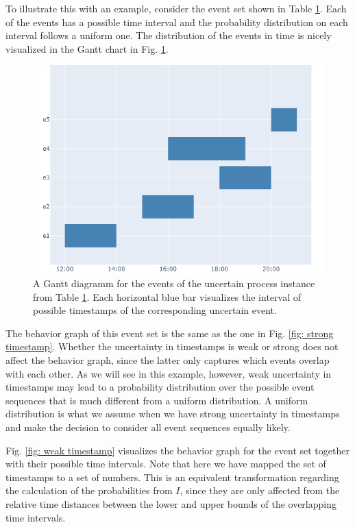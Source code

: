 \begin{itemize}
\begin{table}[h]
\begin{tabular}{ccc}
	\end{tabular}
	\label{table: weak timestamps}
\end{table} 
%
%
%

To illustrate this with an example, consider the event set shown in Table \ref{table: weak timestamps}.
Each of the events has a possible time interval and the probability distribution on each interval follows a uniform one.
The distribution of the events in time is nicely visualized in the Gantt chart in Fig. \ref{fig: gantt}. 
%
%
%
\begin{figure}
	\centering
	\includegraphics[width=0.8\columnwidth]{figures/gantt_thesis.png}
	\caption{A Gantt diagramm for the events of the uncertain process instance from Table \ref{table: weak timestamps}.
	Each horizontal blue bar visualizes the interval of possible timestamps of the corresponding uncertain event.}
	\label{fig: gantt}
\end{figure}
%
%
%
The behavior graph of this event set is the same as the one in Fig. \ref{fig: strong timestamp}.
Whether the uncertainty in timestamps is weak or strong does not affect the behavior graph, since the latter only captures which events overlap with each other.
As we will see in this example, however, weak uncertainty in timestamps may lead to a probability distribution over the possible event sequences that is much different from a uniform distribution.
A uniform distribution is what we assume when we have strong uncertainty in timestamps and make the decision to consider all event sequences equally likely.

Fig. \ref{fig: weak timestamp} visualizes the behavior graph for the event set together with their possible time intervals.
Note that here we have mapped the set of timestamps to a set of numbers.
This is an equivalent transformation regarding the calculation of the probabilities from $I$, since they are only affected from the relative time distances between the lower and upper bounds of the overlapping time intervals.
%
%
%
\begin{figure}[h] 
\centering


\end{figure}
\end{itemize}

